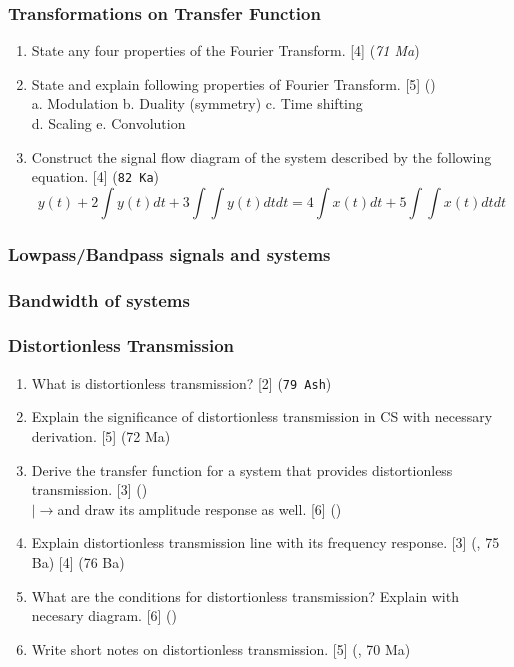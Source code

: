 \documentclass[12pt]{article}
\newcommand{\lb}{\\$\left|\rightarrow\right.$}
\begin{document}
    \subsubsection{Transformations on Transfer Function}
      \begin{enumerate}
        \item State any four properties of the Fourier Transform. \hfill [4] (\textit{71 Ma})

        \item State and explain following properties of Fourier Transform. \hfill [5] ()\\
        a. Modulation \hspace{1cm} b. Duality (symmetry) \hspace{1cm} c. Time shifting\\
        d. Scaling \hspace{1.8cm} e. Convolution

        \item Construct the signal flow diagram of the system described by the following equation. \hfill [4] (\texttt{82 Ka})\\
          $$y(t) + 2 \int y(t) dt + 3 \int \int y(t) dt dt = 4 \int x(t)dt + 5 \int \int x(t) dt dt$$
      \end{enumerate}

    \subsubsection{Lowpass/Bandpass signals and systems}
    \subsubsection{Bandwidth of systems}
    \subsubsection{Distortionless Transmission}
      \begin{enumerate}
        \item What is distortionless transmission? \hfill [2] (\texttt{79 Ash})

        \item Explain the significance of distortionless transmission in CS with necessary derivation. \hfill [5] (72 Ma)

        \item Derive the transfer function for a system that provides distortionless transmission. \hfill [3] ()
        \lb and draw its amplitude response as well. \hfill [6] ()

        \item Explain distortionless transmission line with its frequency response. \hfill [3] (, 75 Ba) [4] (76 Ba)

        \item What are the conditions for distortionless transmission? Explain with necesary diagram. \hfill [6] ()

        \item Write short notes on distortionless transmission. \hfill [5] (, 70 Ma)
      \end{enumerate}
\end{document}
